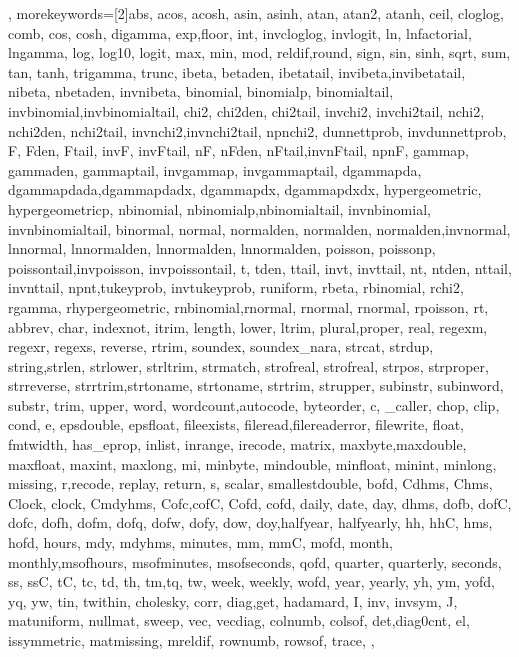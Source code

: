 {{	},
	morekeywords=[2]{abs, acos, acosh, asin, asinh, atan, atan2, atanh, ceil, cloglog, comb, cos, cosh, digamma, exp,floor, int, invcloglog, invlogit, ln, lnfactorial, lngamma, log, log10, logit, max, min, mod, reldif,round, sign, sin, sinh, sqrt, sum, tan, tanh, trigamma, trunc, ibeta, betaden, ibetatail, invibeta,invibetatail, nibeta, nbetaden, invnibeta, binomial, binomialp, binomialtail, invbinomial,invbinomialtail, chi2, chi2den, chi2tail, invchi2, invchi2tail, nchi2, nchi2den, nchi2tail, invnchi2,invnchi2tail, npnchi2, dunnettprob, invdunnettprob, F, Fden, Ftail, invF, invFtail, nF, nFden, nFtail,invnFtail, npnF, gammap, gammaden, gammaptail, invgammap, invgammaptail, dgammapda, dgammapdada,dgammapdadx, dgammapdx, dgammapdxdx, hypergeometric, hypergeometricp, nbinomial, nbinomialp,nbinomialtail, invnbinomial, invnbinomialtail, binormal, normal, normalden, normalden, normalden,invnormal, lnnormal, lnnormalden, lnnormalden, lnnormalden, poisson, poissonp, poissontail,invpoisson, invpoissontail, t, tden, ttail, invt, invttail, nt, ntden, nttail, invnttail, npnt,tukeyprob, invtukeyprob, runiform, rbeta, rbinomial, rchi2, rgamma, rhypergeometric, rnbinomial,rnormal, rnormal, rnormal, rpoisson, rt, abbrev, char, indexnot, itrim, length, lower, ltrim, plural,proper, real, regexm, regexr, regexs, reverse, rtrim, soundex, soundex_nara, strcat, strdup, string,strlen, strlower, strltrim, strmatch, strofreal, strofreal, strpos, strproper, strreverse, strrtrim,strtoname, strtoname, strtrim, strupper, subinstr, subinword, substr, trim, upper, word, wordcount,autocode, byteorder, c, _caller, chop, clip, cond, e, epsdouble, epsfloat, fileexists, fileread,filereaderror, filewrite, float, fmtwidth, has_eprop, inlist, inrange, irecode, matrix, maxbyte,maxdouble, maxfloat, maxint, maxlong, mi, minbyte, mindouble, minfloat, minint, minlong, missing, r,recode, replay, return, s, scalar, smallestdouble, bofd, Cdhms, Chms, Clock, clock, Cmdyhms, Cofc,cofC, Cofd, cofd, daily, date, day, dhms, dofb, dofC, dofc, dofh, dofm, dofq, dofw, dofy, dow, doy,halfyear, halfyearly, hh, hhC, hms, hofd, hours, mdy, mdyhms, minutes, mm, mmC, mofd, month, monthly,msofhours, msofminutes, msofseconds, qofd, quarter, quarterly, seconds, ss, ssC, tC, tc, td, th, tm,tq, tw, week, weekly, wofd, year, yearly, yh, ym, yofd, yq, yw, tin, twithin, cholesky, corr, diag,get, hadamard, I, inv, invsym, J, matuniform, nullmat, sweep, vec, vecdiag, colnumb, colsof, det,diag0cnt, el, issymmetric, matmissing, mreldif, rownumb, rowsof, trace,
	},
}



